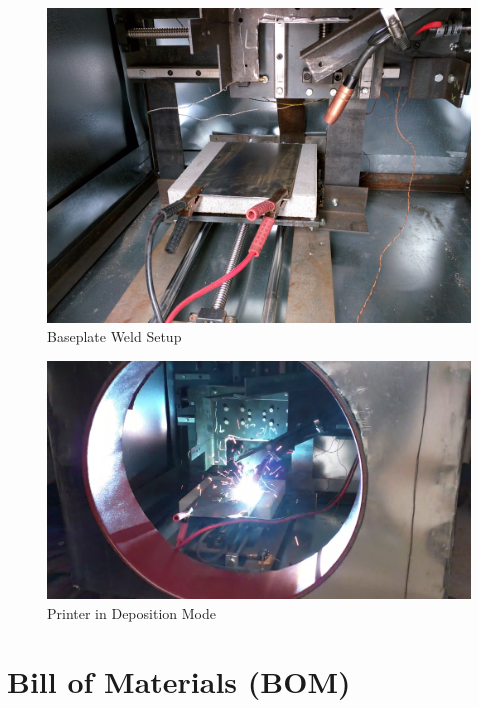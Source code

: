 \documentclass[12pt]{article}
\begin{document}
\begin{figure}[!ht]
\centering
\includegraphics[width=.75\textwidth]{IMG_20150410_163441}
\caption{Baseplate Weld Setup}
\end{figure}




\begin{figure}[!ht]
\centering
\includegraphics[width=.75\textwidth]{23}
\caption{Printer in Deposition Mode}
\end{figure}




\clearpage

\section{Bill of Materials (BOM)}
\end{document}
